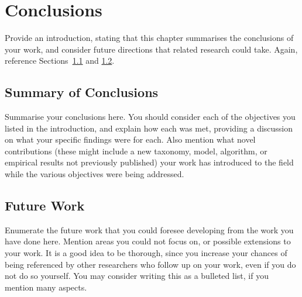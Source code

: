 
\chapter{Conclusions}
\label{chap:conclusions}


Provide an introduction, stating that this chapter summarises the conclusions of your work, and consider future directions that related research could take. Again, reference Sections~\ref{sec:conclusions:conclusion_summary} and \ref{sec:conclusions:future_work}.


\section{Summary of Conclusions}
\label{sec:conclusions:conclusion_summary}

Summarise your conclusions here. You should consider each of the objectives you listed in the introduction, and explain how each was met, providing a discussion on what your specific findings were for each. Also mention what novel contributions (these might include a new taxonomy, model, algorithm, or empirical results not previously published) your work has introduced to the field while the various objectives were being addressed.


\section{Future Work}
\label{sec:conclusions:future_work}

Enumerate the future work that you could foresee developing from the work you have done here. Mention areas you could not focus on, or possible extensions to your work. It is a good idea to be thorough, since you increase your chances of being referenced by other researchers who follow up on your work, even if you do not do so yourself. You may consider writing this as a bulleted list, if you mention many aspects.

